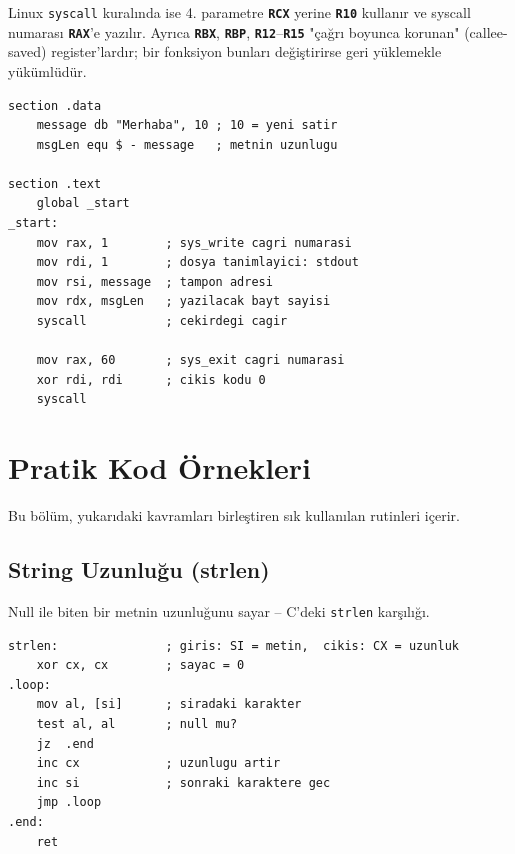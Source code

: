 \documentclass[11pt,a4paper]{article}
\newcommand{\reg}[1]{\texttt{\color{anaMavi}\textbf{#1}}}
\newcommand{\kod}[1]{\texttt{\color{koyuGri}#1}}
\begin{document}
\begin{bilgikutu}
Linux \kod{syscall} kuralında ise 4. parametre \reg{RCX} yerine \reg{R10}
kullanır ve syscall numarası \reg{RAX}'e yazılır. Ayrıca \reg{RBX}, \reg{RBP},
\reg{R12}--\reg{R15} "çağrı boyunca korunan" (callee-saved) register'lardır;
bir fonksiyon bunları değiştirirse geri yüklemekle yükümlüdür.
\end{bilgikutu}

\begin{ornekkutu}
\begin{lstlisting}
section .data
    message db "Merhaba", 10 ; 10 = yeni satir
    msgLen equ $ - message   ; metnin uzunlugu

section .text
    global _start
_start:
    mov rax, 1        ; sys_write cagri numarasi
    mov rdi, 1        ; dosya tanimlayici: stdout
    mov rsi, message  ; tampon adresi
    mov rdx, msgLen   ; yazilacak bayt sayisi
    syscall           ; cekirdegi cagir

    mov rax, 60       ; sys_exit cagri numarasi
    xor rdi, rdi      ; cikis kodu 0
    syscall
\end{lstlisting}
\end{ornekkutu}

\section{Pratik Kod Örnekleri}

Bu bölüm, yukarıdaki kavramları birleştiren sık kullanılan rutinleri içerir.

\subsection{String Uzunluğu (strlen)}

Null ile biten bir metnin uzunluğunu sayar -- C'deki \kod{strlen} karşılığı.

\begin{ornekkutu}
\begin{lstlisting}
strlen:               ; giris: SI = metin,  cikis: CX = uzunluk
    xor cx, cx        ; sayac = 0
.loop:
    mov al, [si]      ; siradaki karakter
    test al, al       ; null mu?
    jz  .end
    inc cx            ; uzunlugu artir
    inc si            ; sonraki karaktere gec
    jmp .loop
.end:
    ret
\end{lstlisting}
\end{ornekkutu}
\end{document}
